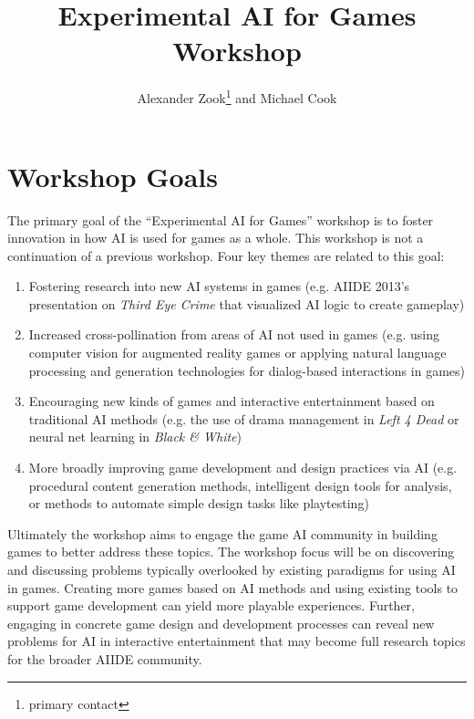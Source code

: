 \documentclass[10pt,a4paper]{article}
\author{Alexander Zook\footnote{primary contact} \hspace{1pt} and Michael Cook}
\title{Experimental AI for Games Workshop}
\date{}
\begin{document}
\maketitle

\section{Workshop Goals}

The primary goal of the ``Experimental AI for Games'' workshop is to foster innovation in how AI is used for games as a whole.
This workshop is not a continuation of a previous workshop.
Four key themes are related to this goal:
\begin{enumerate}
\item Fostering research into new AI systems in games (e.g. AIIDE 2013's presentation on \textit{Third Eye Crime} that visualized AI logic to create gameplay)
\item Increased cross-pollination from areas of AI not used in games (e.g. using computer vision for augmented reality games or applying natural language processing and generation technologies for dialog-based interactions in games)
\item Encouraging new kinds of games and interactive entertainment based on traditional AI methods (e.g. the use of drama management in \textit{Left 4 Dead} or neural net learning in \textit{Black \& White})
\item More broadly improving game development and design practices via AI (e.g. procedural content generation methods, intelligent design tools for analysis, or methods to automate simple design tasks like playtesting)
\end{enumerate}

Ultimately the workshop aims to engage the game AI community in building games to better address these topics.
The workshop focus will be on discovering and discussing problems typically overlooked by existing paradigms for using AI in games.
Creating more games based on AI methods and using existing tools to support game development can yield more playable experiences.
Further, engaging in concrete game design and development processes can reveal new problems for AI in interactive entertainment that may become full research topics for the broader AIIDE community.
\end{document}
